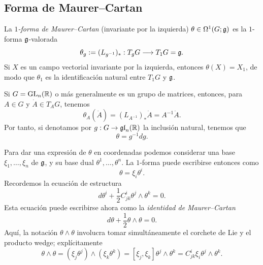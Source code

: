 \documentclass[11pt,a4paper]{amsbook}
\newtheorem{thm}[subsection]{Teorema}
\theoremstyle{remark} \newtheorem{rmk}[subsection]{Observación}
\theoremstyle{definition} \newtheorem{defn}[subsection]{Definición}
\theoremstyle{definition} \newtheorem{ex}[subsection]{Ejemplo}
\theoremstyle{definition} \newtheorem{ej}[subsection]{Ejercicio}
\begin{document}
\subsection{Forma de Maurer--Cartan} La \emph{$1$-forma de Maurer--Cartan} (invariante por la izquierda) $\theta\in \Omega^1(G;\mathfrak{g})$ es la $1$-forma $\mathfrak{g}$-valorada
\begin{equation*}
\theta_g:= (L_{g^{-1}})_*: T_g G \longrightarrow T_1 G = \mathfrak{g}.
\end{equation*}
Si $X$ es un campo vectorial invariante por la izquierda, entonces $\theta(X)=X_1$, de modo que $\theta_1$ es la identificación natural entre $T_1 G$ y $\mathfrak{g}$.

Si $G=\operatorname{GL}_n(\mathbb R)$ o más generalmente es un grupo de matrices, entonces, para $A \in G$ y $\dot{A} \in T_A G$, tenemos
\begin{equation*}
\theta_A(\dot{A}) = (L_{A^{-1}})_* \dot{A} = A^{-1} \dot{A}.
\end{equation*}
Por tanto, si denotamos por $g:G\rightarrow \mathfrak{gl}_n(\mathbb R)$ la inclusión natural, tenemos que
\begin{equation*}
\theta = g^{-1} dg.
\end{equation*}

Para dar una expresión de $\theta$ en coordenadas podemos considerar una base $\xi_1,\dots,\xi_n$ de $\mathfrak{g}$, y su base dual $\theta^1,\dots,\theta^n$. La $1$-forma puede escribirse entonces como
\begin{equation*}
\theta = \xi_i \theta^i.
\end{equation*}
Recordemos la ecuación de estructura
\begin{equation*}
d\theta^i + \frac{1}{2} C^i_{jk}\theta^j\wedge \theta^k = 0.
\end{equation*}
Esta ecuación puede escribirse ahora como la \emph{identidad de Maurer--Cartan}
\begin{equation*}
d\theta + \frac{1}{2} \theta \wedge \theta = 0.
\end{equation*}
Aquí, la notación $\theta \wedge \theta$ involucra tomar simultáneamente el corchete de Lie y el producto wedge; explícitamente
\begin{equation*}
\theta \wedge \theta = (\xi_j \theta^j) \wedge (\xi_k \theta^k) = [\xi_j,\xi_k] \theta^j\wedge \theta^k = C^i_{jk}\xi_i \theta^j\wedge \theta^k.
\end{equation*}




%
\end{document}
